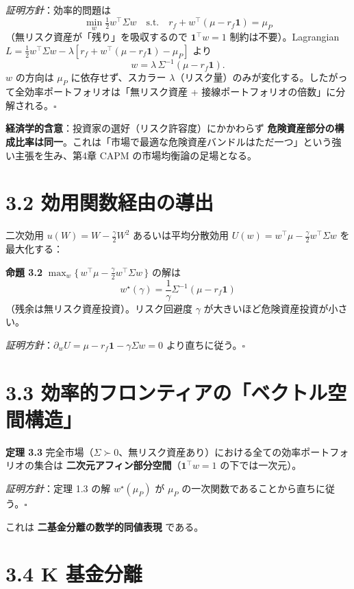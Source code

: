 \documentclass[11pt,a4paper]{report}
\begin{document}
\emph{証明方針}：効率的問題は \[ \min_w \tfrac{1}{2} w^\top \Sigma w \quad \text{s.t.}\quad r_f + w^\top (\mu - r_f \mathbf{1}) = \mu_P \] （無リスク資産が「残り」を吸収するので $\mathbf{1}^\top w = 1$ 制約は不要）。Lagrangian $L = \tfrac{1}{2} w^\top \Sigma w - \lambda[ r_f + w^\top(\mu - r_f\mathbf{1}) - \mu_P]$ より \[ w = \lambda\, \Sigma^{-1}(\mu - r_f \mathbf{1}). \] $w$ の方向は $\mu_P$ に依存せず、スカラー $\lambda$（リスク量）のみが変化する。したがって全効率ポートフォリオは「無リスク資産 + 接線ポートフォリオの倍数」に分解される。$\square$

\textbf{経済学的含意}：投資家の選好（リスク許容度）にかかわらず \textbf{危険資産部分の構成比率は同一}。これは「市場で最適な危険資産バンドルはただ一つ」という強い主張を生み、第4章 CAPM の市場均衡論の足場となる。

\section{3.2 効用関数経由の導出}

二次効用 $u(W) = W - \tfrac{\gamma}{2} W^2$ あるいは平均分散効用 $U(w) = w^\top \mu - \tfrac{\gamma}{2} w^\top \Sigma w$ を最大化する：

\textbf{命題 3.2} $\max_w \{\,w^\top \mu - \tfrac{\gamma}{2} w^\top \Sigma w\,\}$ の解は \[ w^\star(\gamma) = \frac{1}{\gamma} \Sigma^{-1} (\mu - r_f \mathbf{1}) \] （残余は無リスク資産投資）。リスク回避度 $\gamma$ が大きいほど危険資産投資が小さい。

\emph{証明方針}：$\partial_w U = \mu - r_f\mathbf{1} - \gamma \Sigma w = 0$ より直ちに従う。$\square$

\section{3.3 効率的フロンティアの「ベクトル空間構造」}

\textbf{定理 3.3} 完全市場（$\Sigma \succ 0$、無リスク資産あり）における全ての効率ポートフォリオの集合は \textbf{二次元アフィン部分空間}（$\mathbf{1}^\top w = 1$ の下では一次元）。

\emph{証明方針}：定理 1.3 の解 $w^\star(\mu_P)$ が $\mu_P$ の一次関数であることから直ちに従う。$\square$

これは \textbf{二基金分離の数学的同値表現} である。

\section{3.4 K 基金分離}
\end{document}
